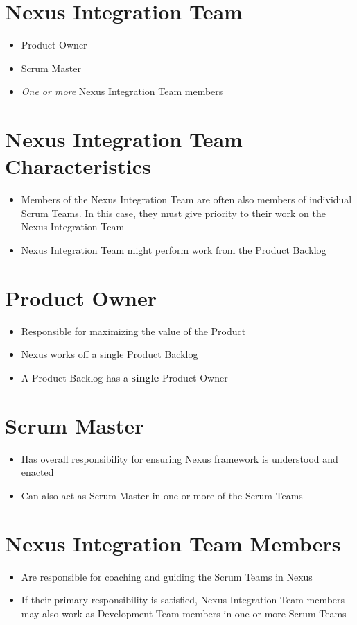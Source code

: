 \documentclass[a4paper,11pt,twocolumn]{article}
\begin{document}
\section*{Nexus Integration Team}
\begin{itemize}
	\item Product Owner
	\item Scrum Master
	\item \textit{One or more} Nexus Integration Team members
\end{itemize}

\section*{Nexus Integration Team Characteristics}
\begin{itemize}
	\item Members of the Nexus Integration Team are often also members of individual Scrum Teams. In this case, they must give priority to their work on the Nexus Integration Team
	\item Nexus Integration Team might perform work from the Product Backlog
\end{itemize}

\section*{Product Owner}
\begin{itemize}
	\item Responsible for maximizing the value of the Product
	\item Nexus works off a single Product Backlog
	\item A Product Backlog has a \textbf{single} Product Owner
\end{itemize}

\section*{Scrum Master}
\begin{itemize}
	\item Has overall responsibility for ensuring Nexus framework is understood and enacted
	\item Can also act as Scrum Master in one or more of the Scrum Teams
\end{itemize}

\section*{Nexus Integration Team Members}
\begin{itemize}
	\item Are responsible for coaching and guiding the Scrum Teams in Nexus
	\item If their primary responsibility is satisfied, Nexus Integration Team members may also work as Development Team members in one or more Scrum Teams
\end{itemize}
\end{document}

